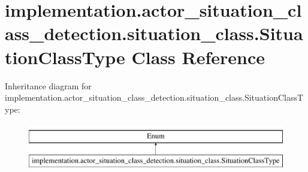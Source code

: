\hypertarget{classimplementation_1_1actor__situation__class__detection_1_1situation__class_1_1_situation_class_type}{}\section{implementation.\+actor\+\_\+situation\+\_\+class\+\_\+detection.\+situation\+\_\+class.\+Situation\+Class\+Type Class Reference}
\label{classimplementation_1_1actor__situation__class__detection_1_1situation__class_1_1_situation_class_type}
Inheritance diagram for implementation.\+actor\+\_\+situation\+\_\+class\+\_\+detection.\+situation\+\_\+class.\+Situation\+Class\+Type\+:\begin{figure}[H]
\begin{center}
\leavevmode
\includegraphics[height=2.000000cm]{classimplementation_1_1actor__situation__class__detection_1_1situation__class_1_1_situation_class_type}
\end{center}
\end{figure}
